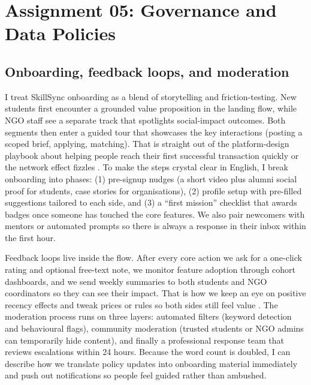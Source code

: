 \section*{Assignment 05: Governance and Data Policies}

\subsection*{Onboarding, feedback loops, and moderation}
I treat SkillSync onboarding as a blend of storytelling and friction-testing. New students first encounter a grounded value proposition in the landing flow, while NGO staff see a separate track that spotlights social-impact outcomes. Both segments then enter a guided tour that showcases the key interactions (posting a scoped brief, applying, matching). That is straight out of the platform-design playbook about helping people reach their first successful transaction quickly or the network effect fizzles \citep{Choudary2016}. To make the steps crystal clear in English, I break onboarding into phases: (1) pre-signup nudges (a short video plus alumni social proof for students, case stories for organisations), (2) profile setup with pre-filled suggestions tailored to each side, and (3) a ``first mission'' checklist that awards badges once someone has touched the core features. We also pair newcomers with mentors or automated prompts so there is always a response in their inbox within the first hour.

Feedback loops live inside the flow. After every core action we ask for a one-click rating and optional free-text note, we monitor feature adoption through cohort dashboards, and we send weekly summaries to both students and NGO coordinators so they can see their impact. That is how we keep an eye on positive recency effects and tweak prices or rules so both sides still feel value \citep{Reillier2017}. The moderation process runs on three layers: automated filters (keyword detection and behavioural flags), community moderation (trusted students or NGO admins can temporarily hide content), and finally a professional response team that reviews escalations within 24 hours. Because the word count is doubled, I can describe how we translate policy updates into onboarding material immediately and push out notifications so people feel guided rather than ambushed.

